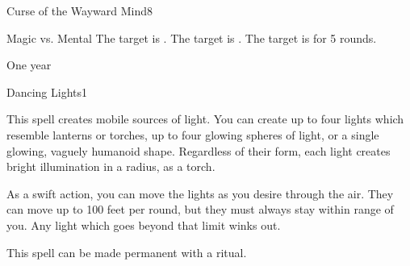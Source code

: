 \begin{spellsection}{Curse of the Wayward Mind}{8}
    \begin{spellheader}
    \end{spellheader}
    \begin{spellcontent}
        \begin{spelltargetinginfo}
        \end{spelltargetinginfo}
        \begin{spelleffects}
            \begin{spellattack}{Magic vs. Mental}
                \spellsuccess The target is \disoriented.
                \spellcritical The target is \confused.
                \spellfailure The target is \disoriented for 5 rounds.
            \end{spellattack}
            \spelldur One year
        \end{spelleffects}
    \end{spellcontent}
    \begin{spellfooter}
        \spellnotes \cursespellnotes
        \miscastrandom
    \end{spellfooter}
\end{spellsection}


\begin{spellsection}{Dancing Lights}{1}
    \begin{spellheader}
    \end{spellheader}
    \begin{spellcontent}
        \begin{spelltargetinginfo}
            \spellrng{\rngmed}
        \end{spelltargetinginfo}
        \begin{spelleffects}
            \spelleffect This spell creates mobile sources of light. You can create up to four lights which resemble lanterns or torches, up to four glowing spheres of light, or a single glowing, vaguely humanoid shape. Regardless of their form, each light creates bright illumination in a \areamed radius, as a torch.

            As a swift action, you can move the lights as you desire through the air. They can move up to 100 feet per round, but they must always stay within range of you. Any light which goes beyond that limit winks out.
            \spelldur \durshort \dismissable
        \end{spelleffects}
    \end{spellcontent}
    \begin{spellfooter}
        \spellnotes This spell can be made permanent with a  ritual.
        \miscastexplode
    \end{spellfooter}
\end{spellsection}

